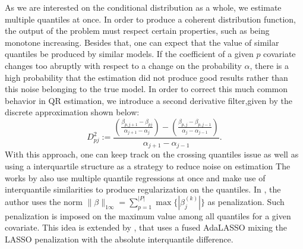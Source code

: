 As we are interested on the conditional distribution as a whole, we estimate multiple quantiles at once. In order to produce a coherent distribution function, the output of the problem must respect certain properties, such as being monotone increasing. 
Besides that, one can expect that the value of similar quantiles be produced by similar models. If the coefficient of a given $p$ covariate changes too abruptly with respect to a change on the probability $\alpha$, there is a high probability that the estimation did not produce good results rather than this noise belonging to the true model.  In order to correct this much common behavior in QR estimation, we introduce a second derivative filter,given by the discrete approximation shown below:
\begin{equation}
D_{pj}^{2}:=\frac{\left(\frac{\beta_{p,j+1}-\beta_{pj}}{\alpha_{j+1}-\alpha_{j}}\right)-\left(\frac{\beta_{p,j}-\beta_{p,j-1}}{\alpha_{j}-\alpha_{j-1}}\right)}{\alpha_{j+1}-\alpha_{j-1}}.
\end{equation}
With this approach, one can keep track on the crossing quantiles issue as well as using a interquartile structure as a strategy to reduce noise on estimation %
The works by \cite{zou_regularized_2008, jiang_interquantile_2014} also use multiple quantile regressions at once and make use of interquantile similarities to produce regularization on the quantiles. In \cite{zou_regularized_2008}, the author uses the norm $\| \beta \|_{1\infty}=\sum_{p=1}^{|P|} \max\{ |\beta_j^{(k)} |\}$ as penalization. Such penalization is imposed on the maximum value among all quantiles for a given covariate. This idea is extended by \cite{jiang_interquantile_2014}, that uses a fused AdaLASSO mixing the LASSO penalization with the absolute interquantile difference.

